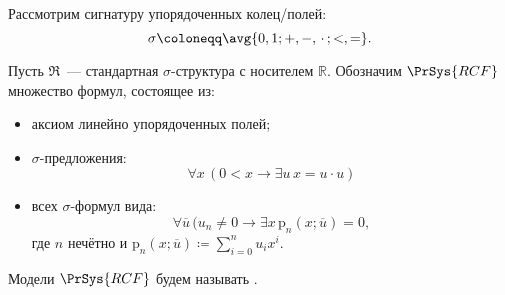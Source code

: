 Рассмотрим сигнатуру упорядоченных колец/полей:
$$
    \sigma \coloneqq \avg{0, 1; +, -, \,\cdot\,; <, =}.
$$
    
Пусть $\mathfrak{R}$~--- стандартная $\sigma$-структура с носителем $\mathbb{R}$. Обозначим
$\PrSys{RCF}$ множество формул, состоящее из:
\begin{itemize}
    \item аксиом линейно упорядоченных полей;
    \item $\sigma$-предложения:
        $$
            \forall x\, (0 < x \rightarrow \exists u\, x = u \cdot u)
        $$
    \item всех $\sigma$-формул вида:
        $$
        \forall \overline{u}\, (u_n \ne 0 \rightarrow \exists x\, \mathrm{p}_n(x; \overline{u}) = 0,
        $$
        где $n$ нечётно и $\mathrm{p}_n(x; \overline{u}) \coloneqq \sum\limits_{i = 0}^n u_i x^i$.
\end{itemize}

Модели $\PrSys{RCF}$ будем называть .
